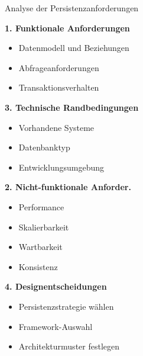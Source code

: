 \begin{corollary}{Analyse der Persistenzanforderungen}

    \begin{minipage}[t]{0.5\textwidth}
\textbf{1. Funktionale Anforderungen}
\begin{itemize}
    \item Datenmodell und Beziehungen
    \item Abfrageanforderungen
    \item Transaktionsverhalten 
\end{itemize}

\textbf{3. Technische Randbedingungen}
\begin{itemize}
    \item Vorhandene Systeme
    \item Datenbanktyp
    \item Entwicklungsumgebung
\end{itemize}
\end{minipage}
\begin{minipage}[t]{0.5\textwidth}
\textbf{2. Nicht-funktionale Anforder.}
\begin{itemize}
    \item Performance
    \item Skalierbarkeit
    \item Wartbarkeit
    \item Konsistenz
\end{itemize}

\textbf{4. Designentscheidungen}
\begin{itemize}
    \item Persistenzstrategie wählen
    \item Framework-Auswahl
    \item Architekturmuster festlegen
\end{itemize}
\end{minipage}
\end{corollary}




